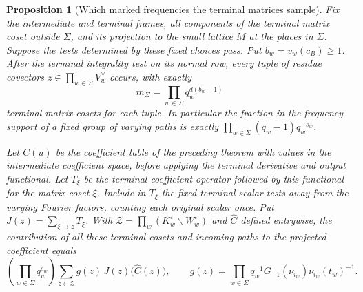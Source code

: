 \documentclass[a4paper,11pt]{article}
\newtheorem{proposition}{Proposition}[section]
\theoremstyle{definition}
\theoremstyle{remark}
\numberwithin{equation}{section}
\begin{document}
\begin{proposition}[Which marked frequencies the terminal matrices sample]
\label{prop:markedsampling387}
Fix the intermediate and terminal frames, all components of the
terminal matrix coset outside \(\Sigma\), and its projection
to the small lattice \(M\) at the places in \(\Sigma\).
Suppose the tests determined by these fixed choices pass.
Put \(b_w=v_w(c_B)\ge1\). After the terminal integrality
test on its normal row, every tuple of residue covectors
\(z\in\prod_{w\in\Sigma}V_w^\vee\) occurs, with exactly
\[
                 m_\Sigma=\prod_{w\in\Sigma}q_w^{d(b_w-1)}
\]
terminal matrix cosets for each tuple. In particular the
fraction in the frequency support of a fixed group of
varying paths is exactly
\(\prod_{w\in\Sigma}(q_w-1)q_w^{-s_w}\).

Let \(C(u)\) be the coefficient table of the preceding theorem
with values in the intermediate coefficient space, before applying
the terminal derivative and output functional. Let \(T_\xi\)
be the terminal coefficient operator followed by this functional
for the matrix coset \(\xi\). Include in \(T_\xi\) the fixed
terminal scalar tests away from the varying Fourier factors,
counting each original scalar once. Put
\(J(z)=\sum_{\xi\mapsto z}T_\xi\). With
\(\mathcal Z=\prod_w(K_w^\circ\smallsetminus W_w^\circ)\)
and \(\widehat C\) defined entrywise, the contribution of all
these terminal cosets and incoming paths to the projected
coefficient equals
\[
    \left(\prod_{w\in\Sigma}q_w^{s_w}\right)
        \sum_{z\in\mathcal Z} g(z)\,J(z)\bigl(\widehat C(z)\bigr),
    \qquad
    g(z)=\prod_{w\in\Sigma}q_w^{-1}G_{-1}(\nu_{i_w})
                                      \nu_{i_w}(t_w)^{-1}.
\]
\end{proposition}
\end{document}
